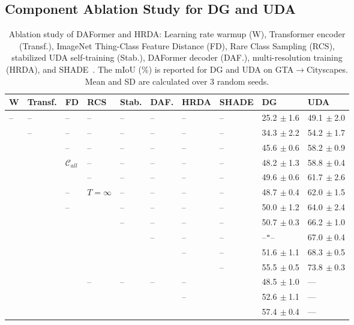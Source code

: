 \documentclass[journal,compsoc]{IEEEtran}
\newcommand*{\cm}{\checkmark}
\newcommand*{\g}{\color{gray}}
\newcommand{\spm}[1]{\tiny{$\,\pm$#1}}
\begin{document}
\subsection{Component Ablation Study for DG and UDA}
\label{sec:component_ablation}

\begin{table}
\centering
\caption{
Ablation study of DAFormer and HRDA: Learning rate warmup (W), Transformer encoder (Transf.), ImageNet Thing-Class Feature Distance (FD), Rare Class Sampling (RCS), stabilized UDA self-training (Stab.), DAFormer decoder (DAF.), multi-resolution training (HRDA), and SHADE~\cite{zhao2022style}. The mIoU (\%) is reported for DG and UDA on GTA$\to$Cityscapes. Mean and SD are calculated over 3 random seeds.
}
\label{tab:highlevel_ablation}
\setlength{\tabcolsep}{2pt}
\footnotesize

\begin{tabular}{llllllllll}
\toprule
W & Transf. & FD& RCS & Stab. & DAF. & HRDA & SHADE & DG & UDA \\
\midrule
-- & --  & -- & --  & -- & --  & -- & --  & 25.2\spm{1.6} & 49.1\spm{2.0} \\
\cm & --  & -- & --  & -- & --  & -- & --  & 34.3\spm{2.2} & 54.2\spm{1.7} \\
\cm & \cm & --  & -- & --  & -- & --  & -- & 45.6\spm{0.6} & 58.2\spm{0.9} \\
\midrule
\g \cm & \g \cm & \g $\mathcal{C}_\mathit{all}$ & \g -- & \g -- & \g -- & \g -- & \g -- & \g 48.2\spm{1.3} & \g 58.8\spm{0.4} \\
\cm & \cm & \cm & --  & -- & --  & -- & --  & 49.6\spm{0.6} & 61.7\spm{2.6} \\
\g \cm & \g \cm & \g --  & \g $T{=}\infty$ & \g --  & \g -- & \g --  & \g -- & \g 48.7\spm{0.4}  & \g 62.0\spm{1.5} \\
\cm & \cm & --  & \cm & --  & -- & --  & -- & 50.0\spm{1.2} & 64.0\spm{2.4} \\
\cm & \cm & \cm & \cm & --  & -- & --  & -- & 50.7\spm{0.3} & 66.2\spm{1.0} \\
\cm & \cm & \cm & \cm & \cm & --  & -- & --  & --\texttt{"}-- & 67.0\spm{0.4} \\
\midrule
\cm & \cm & \cm & \cm & \cm & \cm & --  & -- & 51.6\spm{1.1} & 68.3\spm{0.5} \\
\cm & \cm & \cm & \cm & \cm & \cm & \cm & --  & 55.5\spm{0.5} & 73.8\spm{0.3} \\
\midrule
\g \cm & \g \cm & \g \cm & \g -- & \g -- & \g -- & \g --  & \g \cm & \g 48.5\spm{1.0} & \g --- \\
\cm & \cm & \cm & \cm & \cm & \cm & --  & \cm & 52.6\spm{1.1} & --- \\
\cm & \cm & \cm & \cm & \cm & \cm & \cm & \cm & 57.4\spm{0.4} & --- \\
\bottomrule
\end{tabular}

\end{table} 
\end{document}
